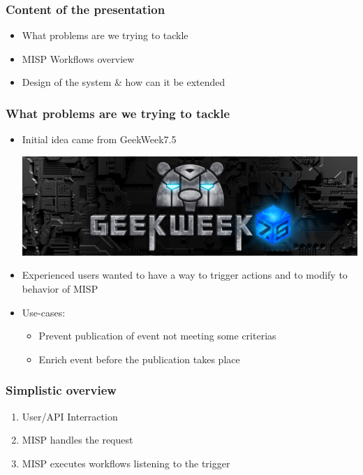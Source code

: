 
\begin{frame}[t,plain]
\titlepage
\end{frame}

\begin{frame}
    \frametitle{Content of the presentation}
    \begin{itemize}
        \item What problems are we trying to tackle
        \item MISP Workflows overview
        \item Design of the system \& how can it be extended
    \end{itemize}
\end{frame}

\begin{frame}
    \frametitle{What problems are we trying to tackle}
    \begin{itemize}
        \item Initial idea came from GeekWeek7.5
        \begin{center}
            \includegraphics[width=0.5\linewidth]{pictures/geekweek75.jpg}
        \end{center}
        \item Experienced users wanted to have a way to trigger actions and to modify to behavior of MISP
        \item Use-cases:
        \begin{itemize}
            \item Prevent publication of event not meeting some criterias
            \item Enrich event before the publication takes place
        \end{itemize}
    \end{itemize}
\end{frame}

\begin{frame}
    \frametitle{Simplistic overview}
    \begin{enumerate}
        \item User/API Interraction
        \item MISP handles the request
        \item MISP executes workflows listening to the trigger
    \end{enumerate}
\end{frame}

